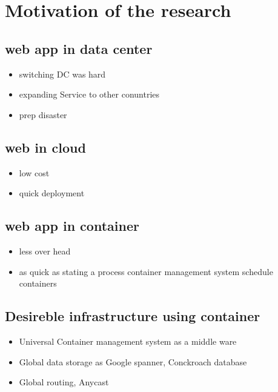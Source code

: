 
\section{Motivation of the research}

\subsection{web app in data center}

\begin{itemize}
\item switching DC was hard 
\item expanding Service to other conuntries
\item prep disaster
\end{itemize}

\subsection{web in cloud}

\begin{itemize}
\item low cost
\item quick deployment
\end{itemize}

\subsection{web app in container}

\begin{itemize}
\item less over head
\item as quick as stating a process
\itme container management system schedule containers
\end{itemize}

\subsection{Desireble infrastructure using container}

\begin{itemize}
\item Universal Container management system as a middle ware
\item Global data storage as Google spanner, Conckroach database
\item Global routing, Anycast 
\end{itemize}

